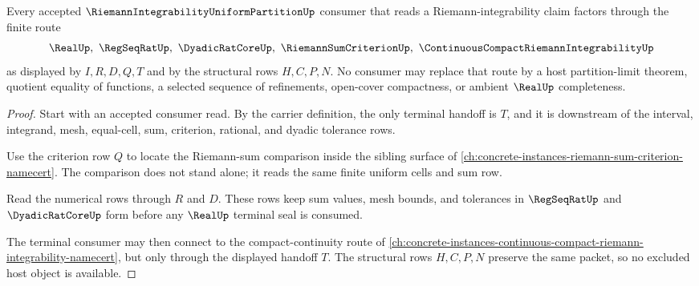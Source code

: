 \begin{theorem}
\label{thm:riemann-integrability-uniform-partition-nonescape}
Every accepted $\RiemannIntegrabilityUniformPartitionUp$ consumer that reads a Riemann-integrability claim factors through the finite route
$$
\RealUp,\ \RegSeqRatUp,\ \DyadicRatCoreUp,\ \RiemannSumCriterionUp,\ \ContinuousCompactRiemannIntegrabilityUp
$$
as displayed by $I,R,D,Q,T$ and by the structural rows $H,C,P,N$. No consumer may replace that route by a host partition-limit theorem, quotient equality of functions, a selected sequence of refinements, open-cover compactness, or ambient $\RealUp$ completeness.
\end{theorem}
\begin{proof}
Start with an accepted consumer read. By the carrier definition, the only terminal handoff is $T$, and it is downstream of the interval, integrand, mesh, equal-cell, sum, criterion, rational, and dyadic tolerance rows.

Use the criterion row $Q$ to locate the Riemann-sum comparison inside the sibling surface of \autoref{ch:concrete-instances-riemann-sum-criterion-namecert}. The comparison does not stand alone; it reads the same finite uniform cells and sum row.

Read the numerical rows through $R$ and $D$. These rows keep sum values, mesh bounds, and tolerances in $\RegSeqRatUp$ and $\DyadicRatCoreUp$ form before any $\RealUp$ terminal seal is consumed.

The terminal consumer may then connect to the compact-continuity route of \autoref{ch:concrete-instances-continuous-compact-riemann-integrability-namecert}, but only through the displayed handoff $T$. The structural rows $H,C,P,N$ preserve the same packet, so no excluded host object is available.
\end{proof}



